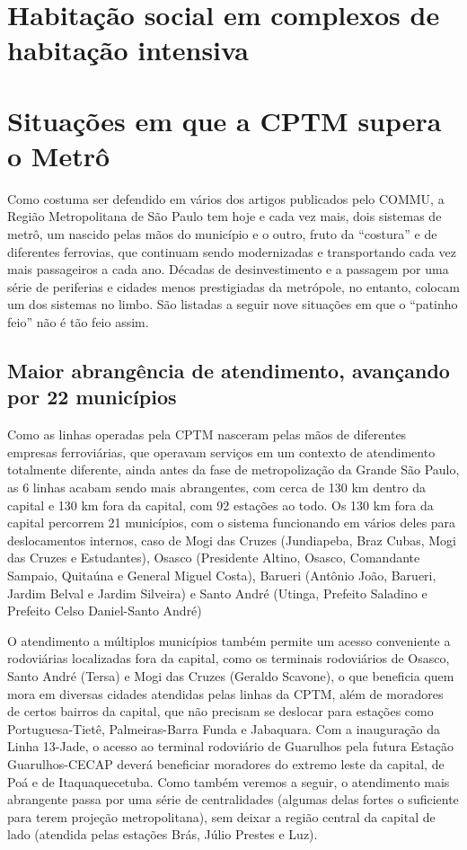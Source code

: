 \documentclass[11pt,fleqn]{book} %
\begin{document}
\section{Habitação social em complexos de habitação intensiva}

\lipsum[3-4]

\section{Situações em que a CPTM supera o Metrô}

Como costuma ser defendido em vários dos artigos publicados pelo COMMU, a Região Metropolitana de São Paulo tem hoje e cada vez mais, dois sistemas de metrô, um nascido pelas mãos do município e o outro, fruto da ``costura'' e de diferentes ferrovias, que continuam sendo modernizadas e transportando cada vez mais passageiros a cada ano. Décadas de desinvestimento e a passagem por uma série de periferias e cidades menos prestigiadas da metrópole, no entanto, colocam um dos sistemas no limbo. São listadas a seguir nove situações em que o ``patinho feio'' não é tão feio assim.

\subsection{Maior abrangência de atendimento, avançando por 22 municípios}

Como as linhas operadas pela CPTM nasceram pelas mãos de diferentes empresas ferroviárias, que operavam serviços em um contexto de atendimento totalmente diferente, ainda antes da fase de metropolização da Grande São Paulo, as 6 linhas acabam sendo mais abrangentes, com cerca de 130 km dentro da capital e 130 km fora da capital, com 92 estações ao todo. Os 130 km fora da capital percorrem 21 municípios, com o sistema funcionando em vários deles para deslocamentos internos, caso de Mogi das Cruzes (Jundiapeba, Braz Cubas, Mogi das Cruzes e Estudantes), Osasco (Presidente Altino, Osasco, Comandante Sampaio, Quitaúna e General Miguel Costa), Barueri (Antônio João, Barueri, Jardim Belval e Jardim Silveira) e Santo André (Utinga, Prefeito Saladino e Prefeito Celso Daniel-Santo André)

O atendimento a múltiplos municípios também permite um acesso conveniente a rodoviárias localizadas fora da capital, como os terminais rodoviários de Osasco, Santo André (Tersa) e Mogi das Cruzes (Geraldo Scavone), o que beneficia quem mora em diversas cidades atendidas pelas linhas da CPTM, além de moradores de certos bairros da capital, que não precisam se deslocar para estações como Portuguesa-Tietê, Palmeiras-Barra Funda e Jabaquara. Com a inauguração da Linha 13-Jade, o acesso ao terminal rodoviário de Guarulhos pela futura Estação Guarulhos-CECAP deverá beneficiar moradores do extremo leste da capital, de Poá e de Itaquaquecetuba. Como também veremos a seguir, o atendimento mais abrangente passa por uma série de centralidades (algumas delas fortes o suficiente para terem projeção metropolitana), sem deixar a região central da capital de lado (atendida pelas estações Brás, Júlio Prestes e Luz).
\end{document}
